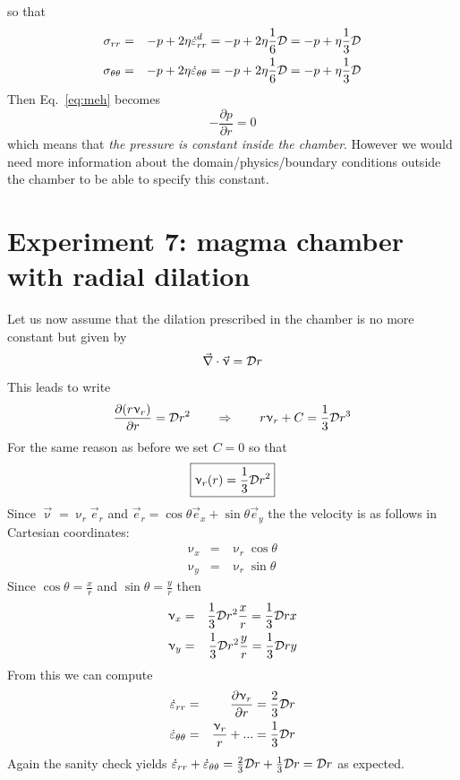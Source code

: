 so that 
\begin{eqnarray}
\sigma_{rr} &=& -p + 2 \eta \dot\varepsilon_{rr}^d = -p + 2 \eta \frac{1}{6} {\cal D} 
= -p + \eta \frac13 {\cal D} \nonumber\\
\sigma_{\theta\theta} &=& -p + 2 \eta \dot\varepsilon_{\theta\theta} = -p + 2 \eta \frac{1}{6} {\cal D} 
= -p + \eta \frac13 {\cal D} \nonumber
\end{eqnarray}
Then Eq.~\eqref{eq:meh}  becomes
\[
-\frac{\partial p}{\partial r} =0
\]
which means that {\it the pressure is constant inside the chamber}.
However we would need more information about the domain/physics/boundary conditions
outside the chamber to be able to specify this constant.




\newpage

\section*{Experiment 7: magma chamber with radial dilation}



Let us now assume that the dilation prescribed in the chamber is no more constant 
but given by 
\[
\vec\nabla \cdot \vec\upnu = {\cal D} r
\]
This leads to write 
\[
\frac{\partial (r \upnu_r) }{\partial r} = {\cal D} r^2 
\qquad
\Rightarrow
\qquad
r \upnu_r +C =  \frac13 {\cal D} r^3 
\]
For the same reason as before we set $C=0$ so that 
\[
\boxed{
\upnu_r(r) = \frac13 {\cal D} r^2
}
\]
Since $\vec\upnu = \upnu_r \vec{e}_r$ and $\vec{e}_r=\cos\theta \vec{e}_x + \sin\theta \vec{e}_y$
the the velocity is as follows in Cartesian coordinates:
\begin{eqnarray}
\upnu_x &=& \upnu_r \cos\theta \\ 
\upnu_y &=& \upnu_r \sin\theta 
\end{eqnarray}
Since $\cos\theta = \frac{x}{r}$ and $\sin\theta = \frac{y}{r}$ then
\begin{eqnarray}
\upnu_x &=& \frac13 {\cal D} r^2 \frac{x}{r} = \frac13 {\cal D}  r x \\ 
\upnu_y &=& \frac13 {\cal D} r^2 \frac{y}{r} = \frac13 {\cal D}  r y 
\end{eqnarray}
From this we can compute
\begin{eqnarray}
\dot\varepsilon_{rr} 
&=& \frac{\partial \upnu_r}{\partial r} 
= \frac23 {\cal D} r \\
\dot\varepsilon_{\theta\theta}
&=& \frac{\upnu_r}{r} + ...
= \frac13 {\cal D} r
\end{eqnarray}
Again the sanity check yields 
$
\dot\varepsilon_{rr} +\dot\varepsilon_{\theta\theta} 
= \frac23 {\cal D} r + \frac13 {\cal D} r = {\cal D} r
$
as expected.

